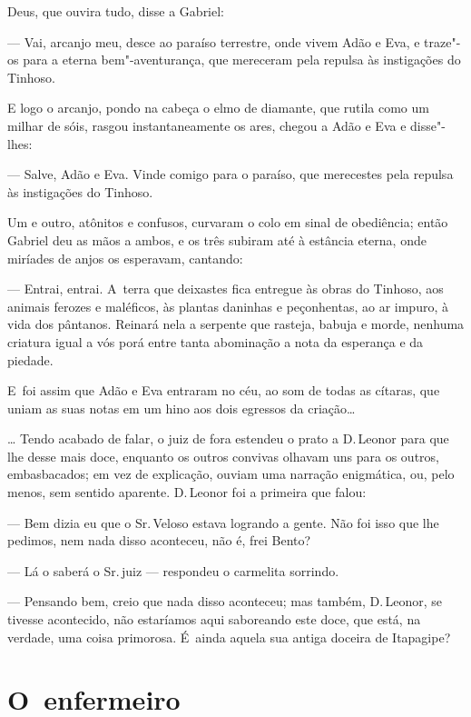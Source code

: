 \begin{linenumbers}
Deus, que ouvira tudo, disse a Gabriel:

--- Vai, arcanjo meu, desce ao paraíso terrestre, onde vivem Adão e Eva,
e traze"-os para a eterna bem"-aventurança, que mereceram pela repulsa às
instigações do Tinhoso.

E logo o arcanjo, pondo na cabeça o elmo de diamante, que rutila como um
milhar de sóis, rasgou instantaneamente os ares, chegou a Adão e Eva e
disse"-lhes:

--- Salve, Adão e Eva. Vinde comigo para o paraíso, que merecestes pela
repulsa às instigações do Tinhoso.

Um e outro, atônitos e confusos, curvaram o colo em sinal de obediência;
então Gabriel deu as mãos a ambos, e os três subiram até à estância
eterna, onde miríades de anjos os esperavam, cantando:

--- Entrai, entrai. A~terra que deixastes fica entregue às obras do
Tinhoso, aos animais ferozes e maléficos, às plantas daninhas e
peçonhentas, ao ar impuro, à vida dos pântanos. Reinará nela a serpente
que rasteja, babuja e morde, nenhuma criatura igual a vós porá entre
tanta abominação a nota da esperança e da piedade.

E~foi assim que Adão e Eva entraram no céu, ao som de todas as cítaras,
que uniam as suas notas em um hino aos dois egressos da criação\ldots{}

\ldots{} Tendo acabado de falar, o juiz de fora estendeu o prato a D.\,Leonor
para que lhe desse mais doce, enquanto os outros convivas olhavam uns
para os outros, embasbacados; em vez de explicação, ouviam uma narração
enigmática, ou, pelo menos, sem sentido aparente. D.\,Leonor foi a
primeira que falou:

--- Bem dizia eu que o Sr.\,Veloso estava logrando a gente. Não foi isso
que lhe pedimos, nem nada disso aconteceu, não é, frei Bento?

--- Lá o saberá o Sr.\,juiz --- respondeu o carmelita sorrindo.

--- Pensando bem, creio que nada disso aconteceu; mas também, D.\,Leonor,
se tivesse acontecido, não estaríamos aqui saboreando este doce, que
está, na verdade, uma coisa primorosa. É~ainda aquela sua antiga doceira
de Itapagipe?

\end{linenumbers}

\chapter{O~enfermeiro}

